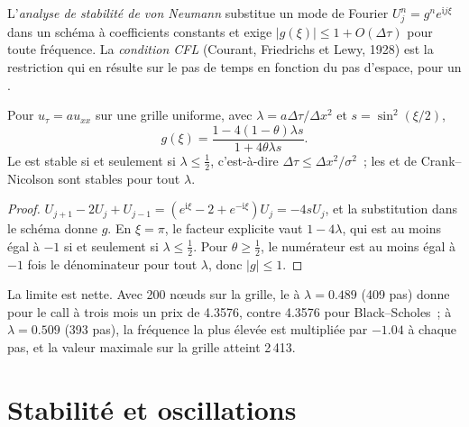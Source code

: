 \begin{definition}\label{def:qm:finite-difference-methods:vn}
L'\emph{analyse de stabilité de von Neumann} substitue un mode de Fourier $U_j^n = g^ne^{\mathrm ij\xi}$ dans un schéma à coefficients constants et exige $|g(\xi)| \le 1 +
O(\Delta\tau)$ pour toute fréquence. La \emph{condition CFL} (Courant, Friedrichs et Lewy, 1928) est la restriction qui en résulte sur le pas de temps en fonction du pas d'espace, pour un
.
\end{definition}

\begin{proposition}\label{prop:qm:finite-difference-methods:amp}
Pour $u_\tau = au_{xx}$ sur une grille uniforme, avec $\lambda = a\Delta\tau/\Delta x^2$ et $s = \sin^2(\xi/2)$,
\[g(\xi) = \frac{1 - 4(1 - \theta)\lambda s}{1 + 4\theta\lambda s}.\]
Le  est stable si et seulement si $\lambda \le \frac12$, c'est-à-dire $\Delta\tau \le \Delta x^2/\sigma^2$~; les  et de Crank--Nicolson sont stables pour tout $\lambda$.
\end{proposition}

\begin{proof}
$U_{j+1} - 2U_j + U_{j-1} = (e^{\mathrm i\xi} - 2 + e^{-\mathrm i\xi})U_j = -4sU_j$, et la substitution dans le schéma donne $g$. En $\xi = \pi$, le facteur explicite vaut $1 - 4\lambda$, qui est au moins égal à $-1$ si et seulement si
$\lambda \le \frac12$. Pour $\theta \ge \frac12$, le numérateur est au moins égal à $-1$ fois le dénominateur pour tout $\lambda$, donc $|g| \le 1$.
\end{proof}

La limite est nette. Avec 200 nœuds sur la grille, le  à $\lambda = 0.489$ (409 pas) donne pour le call à trois mois un prix de 4.3576, contre 4.3576 pour Black--Scholes~; à $\lambda = 0.509$ (393
pas), la fréquence la plus élevée est multipliée par $-1.04$ à chaque pas, et la valeur maximale sur la grille atteint 2\,413.

\section{Stabilité et oscillations}

